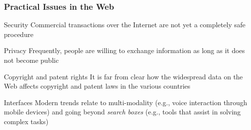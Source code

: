 \documentclass[svgnames]{beamer}
\begin{document}
\begin{frame}
    \frametitle{Practical Issues in the Web}

    \small
    
    \begin{block}{Security}
        Commercial transactions over the Internet are not yet a completely safe procedure
    \end{block}


    \begin{block}{Privacy}
        Frequently, people are willing to exchange information as long as it does not become public
    \end{block}


    \begin{block}{ Copyright and patent rights}
        It is far from clear how the widespread data on the Web affects
        copyright and patent laws in the various countries
    \end{block}

    \begin{block}{Interfaces}
        Modern trends relate to multi-modality (e.g., voice interaction through mobile devices) and going beyond {\it search boxes} (e.g., tools that assist in solving complex tasks)
    \end{block}

\end{frame}



\end{document}
